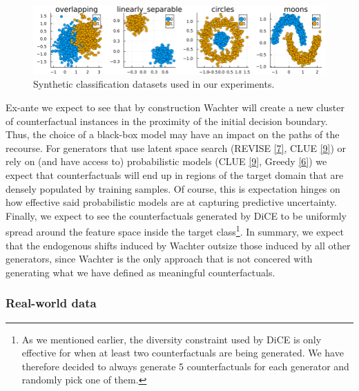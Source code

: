 \documentclass[conference,final,]{IEEEtran}
\begin{document}
\begin{figure}

{\centering \includegraphics[width=0.9\linewidth]{www/synthetic_data} 

}

\caption{Synthetic classification datasets used in our experiments.}\label{fig:synthetic-data}
\end{figure}

Ex-ante we expect to see that by construction Wachter will create a new cluster of counterfactual instances in the proximity of the initial decision boundary. Thus, the choice of a black-box model may have an impact on the paths of the recourse. For generators that use latent space search (REVISE \protect\hyperlink{ref-joshi2019towards}{{[}7{]}}, CLUE \protect\hyperlink{ref-antoran2020getting}{{[}9{]}}) or rely on (and have access to) probabilistic models (CLUE \protect\hyperlink{ref-antoran2020getting}{{[}9{]}}, Greedy \protect\hyperlink{ref-schut2021generating}{{[}6{]}}) we expect that counterfactuals will end up in regions of the target domain that are densely populated by training samples. Of course, this is expectation hinges on how effective said probabilistic models are at capturing predictive uncertainty. Finally, we expect to see the counterfactuals generated by DiCE to be uniformly spread around the feature space inside the target class\footnote{As we mentioned earlier, the diversity constraint used by DiCE is only effective for when at least two counterfactuals are being generated. We have therefore decided to always generate 5 counterfactuals for each generator and randomly pick one of them.}. In summary, we expect that the endogenous shifts induced by Wachter outsize those induced by all other generators, since Wachter is the only approach that is not concered with generating what we have defined as meaningful counterfactuals.

\hypertarget{real-world-data}{%
\subsubsection{Real-world data}\label{real-world-data}}
\end{document}
